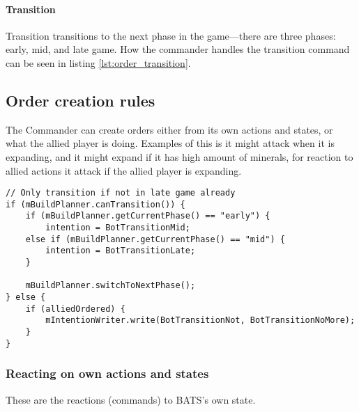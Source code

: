 \paragraph{Transition}
Transition transitions to the next phase in the game—there are three phases: early, mid, and late
game. How the commander handles the transition command can be seen in listing
\ref{lst:order_transition}.

\subsection{Order creation rules}
The Commander can create orders either from its own actions and states, or what the allied player is doing. Examples of this is it might attack when it is expanding, and it might expand if it has high amount of minerals, for reaction to allied actions it attack if the allied player is expanding.
\begin{lstlisting}[label={lst:order_transition},caption={Pseudo-code for transition command}]
// Only transition if not in late game already
if (mBuildPlanner.canTransition()) {
	if (mBuildPlanner.getCurrentPhase() == "early") {
		intention = BotTransitionMid;
	else if (mBuildPlanner.getCurrentPhase() == "mid") {
		intention = BotTransitionLate;
	}

	mBuildPlanner.switchToNextPhase();
} else {
	if (alliedOrdered) {
		mIntentionWriter.write(BotTransitionNot, BotTransitionNoMore);
	}
}
\end{lstlisting}

\subsubsection{Reacting on own actions and states}
These are the reactions (commands) to BATS's own state.

